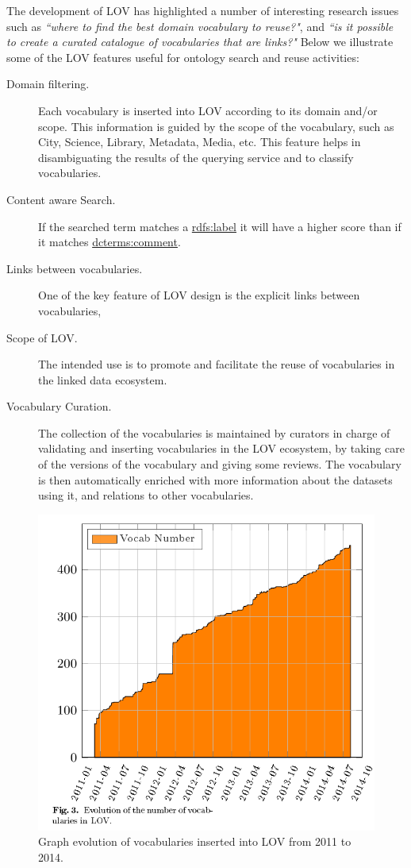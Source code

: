 The development of LOV has highlighted a number of interesting research issues such as \textit{``where to find the best domain vocabulary to reuse?"}, and \textit{``is it possible to create a curated catalogue of vocabularies that are links?"}
Below we illustrate some of the LOV features useful for ontology search and reuse activities:
  
 \begin{description}
	\item [Domain filtering.] Each vocabulary is inserted into LOV according to its domain and/or scope. This information is guided by the scope of the vocabulary, such as City, Science, Library, Metadata, Media, etc. This feature helps in disambiguating the results of the querying service and to classify vocabularies. 
	\item [Content aware Search.] If the searched term matches a \url{rdfs:label} it will have a higher score than if it matches \url{dcterms:comment}.
	\item [Links between vocabularies.] One of the key feature of LOV design is the explicit links between vocabularies, 
	 \item [Scope of LOV.]The intended use is to promote and facilitate the reuse of vocabularies in the linked data ecosystem.
	 \item [Vocabulary Curation.]The collection of the vocabularies is maintained by curators in charge of validating and inserting vocabularies in the LOV ecosystem, by taking care of the versions of the vocabulary and giving some reviews. The vocabulary is then automatically enriched with more information about the datasets using it, and relations to other vocabularies.
 \end{description}


\begin{figure}[h!tb]
\centering
  \includegraphics[width=\linewidth]{img/LOVEvol.png}
  \caption{Graph evolution of vocabularies inserted into LOV from 2011 to 2014.}
  \label{fig:translations}
\end{figure}

